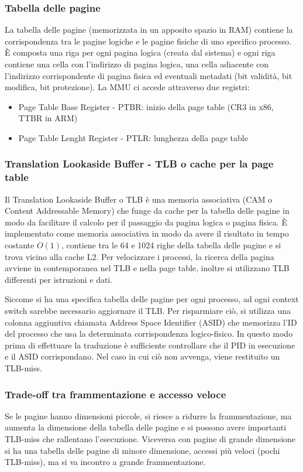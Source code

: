 \documentclass[a4paper]{article}
\begin{document}
\subsubsection*{Tabella delle pagine}
La tabella delle pagine (memorizzata in un apposito spazio in RAM) contiene la corrispondenza tra le pagine logiche e le pagine
fisiche di uno specifico processo. È composta una riga per ogni pagina logica (creata dal sistema) e ogni riga contiene una cella
con l'indirizzo di pagina logica, una cella adiacente con l'indirizzo corrispondente di pagina fisica ed eventuali metadati (bit
validità, bit modifica, bit protezione). La MMU ci accede attraverso due registri:
\begin{itemize}
	\item Page Table Base Register - PTBR: inizio della page table (CR3 in x86, TTBR in ARM)
	\item Page Table Lenght Register - PTLR: lunghezza della page table
\end{itemize}

\subsubsection*{Translation Lookaside Buffer - TLB o cache per la page table}
Il Translation Lookaside Buffer o TLB è una memoria associativa (CAM o Content Addressable Memory) che funge da cache per la
tabella delle pagine in modo da facilitare il calcolo per il passaggio da pagina logica o pagina fisica. È implementato come
memoria associativa in modo da avere il risultato in tempo costante \(O(1)\), contiene tra le 64 e 1024 righe della tabella
delle pagine e si trova vicino alla cache L2. Per velocizzare i processi, la ricerca della pagina avviene in contemporanea
nel TLB e nella page table, inoltre si utilizzano TLB differenti per istruzioni e dati.

Siccome si ha una specifica tabella delle pagine per ogni processo, ad ogni context switch sarebbe necessario aggiornare il
TLB. Per risparmiare ciò, si utilizza una colonna aggiuntiva chiamata Address Space Identifier (ASID) che memorizza l'ID del
processo che usa la determinata corrispondenza logico-fisico. In questo modo prima di effettuare la traduzione è sufficiente 
controllare che il PID in esecuzione e il ASID corrispondano. Nel caso in cui ciò non avvenga, viene restituito un TLB-miss.

\subsubsection*{Trade-off tra frammentazione e accesso veloce}
Se le pagine hanno dimensioni piccole, si riesce a ridurre la frammentazione, ma aumenta la dimensione della tabella delle pagine
e si possono avere importanti TLB-miss che rallentano l'esecuzione. Viceversa con pagine di grande dimensione si ha una tabella
delle pagine di minore dimensione, accessi più veloci (pochi TLB-miss), ma si va incontro a grande frammentazione.
\end{document}
